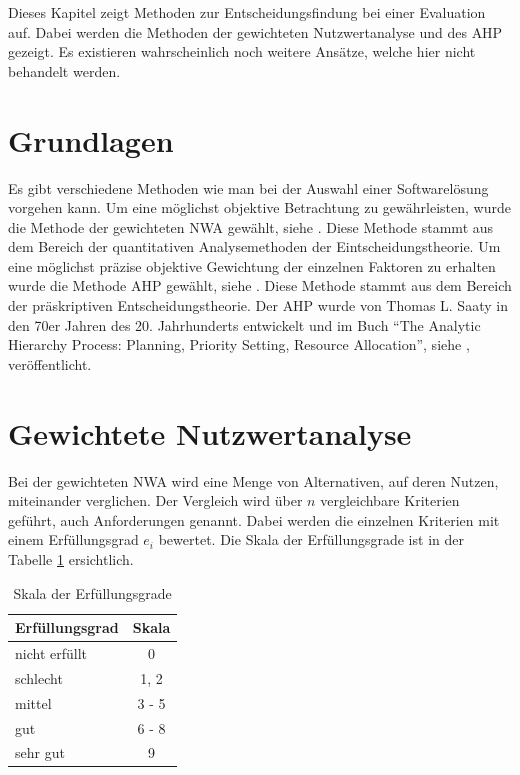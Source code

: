   Dieses Kapitel zeigt Methoden zur Entscheidungsfindung bei einer Evaluation
  auf. Dabei werden die Methoden der gewichteten Nutzwertanalyse und des
  \ac{AHP} gezeigt. Es existieren wahrscheinlich noch weitere Ansätze, welche
  hier nicht behandelt werden.
  
  \section{Grundlagen}
  
  Es gibt verschiedene Methoden wie man bei der Auswahl einer Softwarelösung
  vorgehen kann. Um eine möglichst objektive Betrachtung zu gewährleisten, wurde
  die Methode der gewichteten \ac{NWA} gewählt, siehe \cite{Nutzwertanalyse}.
  Diese Methode stammt aus dem Bereich der quantitativen Analysemethoden der
  Eintscheidungstheorie. Um eine möglichst präzise objektive Gewichtung der
  einzelnen Faktoren zu erhalten wurde die Methode \ac{AHP} gewählt, siehe
  \cite{AnalyticHierarchyProcess}. Diese Methode stammt aus dem Bereich der
  präskriptiven Entscheidungstheorie. Der \ac{AHP} wurde von Thomas L. Saaty in
  den 70er Jahren des 20. Jahrhunderts entwickelt und im Buch ``The Analytic
  Hierarchy Process: Planning, Priority Setting, Resource
  Allocation'', siehe \cite{AnalyticHierarchyProcessBook}, veröffentlicht.
  
  \section{Gewichtete Nutzwertanalyse}
  
  Bei der gewichteten \ac{NWA} wird eine Menge von Alternativen, auf deren
  Nutzen, miteinander verglichen. Der Vergleich wird über \(n\) vergleichbare
  Kriterien geführt, auch Anforderungen genannt. Dabei werden die einzelnen
  Kriterien mit einem Erfüllungsgrad \(e_i\) bewertet. Die Skala der
  Erfüllungsgrade ist in der Tabelle \ref{tab:erfuellungsgrade} ersichtlich.
  
  \begin{table}[hbt]
    \sffamily 
    \begin{center}
      \begin{tabular}{lc}
        \toprule
        \textbf{Erfüllungsgrad} & \textbf{Skala}\\
        \midrule
        nicht erfüllt & 0\\
        schlecht & 1, 2\\
        mittel & 3 - 5\\
        gut & 6 - 8\\
        sehr gut & 9\\
        \bottomrule
      \end{tabular}
      \caption{Skala der Erfüllungsgrade}
      \label{tab:erfuellungsgrade}
    \end{center}
  \end{table}
  
